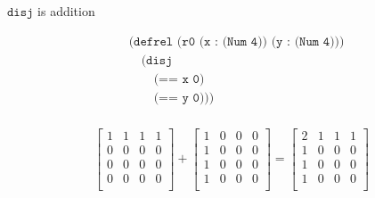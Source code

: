 \documentclass{beamer}
\begin{document}
\begin{frame}{\(\texttt{disj}\) is addition}

	\begin{align*}
		& \texttt{(defrel (r0 (x : (Num 4)) (y : (Num 4)))} \\
		&\quad \texttt{(disj} \\
		&\quad\quad \texttt{(== x 0)} \\
		&\quad\quad \texttt{(== y 0)))} \\
	\end{align*}

	\begin{align*}
		\begin{bmatrix}
			1 & 1 & 1 & 1 \\
			0 & 0 & 0 & 0 \\
			0 & 0 & 0 & 0 \\
			0 & 0 & 0 & 0 \\
		\end{bmatrix}
		+
		\begin{bmatrix}
			1 & 0 & 0 & 0 \\
			1 & 0 & 0 & 0 \\
			1 & 0 & 0 & 0 \\
			1 & 0 & 0 & 0 \\
		\end{bmatrix}
		=
		\begin{bmatrix}
			2 & 1 & 1 & 1 \\
			1 & 0 & 0 & 0 \\
			1 & 0 & 0 & 0 \\
			1 & 0 & 0 & 0 \\
		\end{bmatrix}
	\end{align*}

\end{frame}
\end{document}
